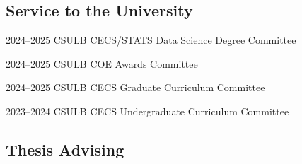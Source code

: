 \documentclass[11pt,letterpaper]{report}
\begin{document}



    \subsection*{Service to the University}

    \begin{tablist}
        \item[2024--2025] \tab{}CSULB CECS/STATS Data Science Degree Committee
        \item[2024--2025] \tab{}CSULB COE  Awards Committee
        \item[2024--2025] \tab{}CSULB CECS Graduate Curriculum Committee
        \item[2023--2024] \tab{}CSULB CECS Undergraduate Curriculum Committee

    \end{tablist}

    \subsection*{Thesis Advising}
\end{document}
